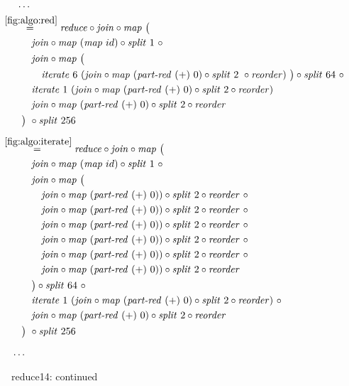 \begin{figure*}[t]
\begin{align*}
  &\hspace{.5em}\ldots\\
%
  &\hspace{-2em}\quad\begin{aligned}
    &\overset{\ref{fig:algo:red}}{=\hspace{.2em}}
      \reduce \circ \join \circ \map\ \big(\\
    &\qquad\quad\join \circ \map\ (\map\ id) \circ \splitN\ 1\ \circ\\
    &\qquad\quad\join \circ \map\ \big(\\
    &\qquad\qquad \iterateN\ 6\ (\join \circ \map\ (\partRed\ (+)\ 0)\circ \splitN\ 2\ \circ \reorder)\ \big)\circ \splitN\ 64\ \circ\\
    &\qquad\quad\iterateN\ 1\ (\join \circ \map\ (\partRed\ (+)\ 0) \circ \splitN\ 2\circ \reorder)\\
    &\qquad\quad\join \circ \map\ (\partRed\ (+)\ 0) \circ \splitN\ 2\circ \reorder\\
    &\qquad\big)\ \circ \splitN\ 256
  \end{aligned}\\[.5em]
%
  &\hspace{-2em}\quad\begin{aligned}
    &\overset{\ref{fig:algo:iterate}}{=\hspace{.2em}}
      \reduce \circ \join \circ \map\ \big(\\
    &\qquad\quad\join \circ \map\ (\map\ id) \circ \splitN\ 1\ \circ\\
    &\qquad\quad\join \circ \map\ \big(\\
    &\qquad\qquad \join \circ \map\ (\partRed\ (+)\ 0))\circ \splitN\ 2 \circ \reorder\ \circ\\
    &\qquad\qquad \join \circ \map\ (\partRed\ (+)\ 0))\circ \splitN\ 2 \circ \reorder\ \circ\\
    &\qquad\qquad \join \circ \map\ (\partRed\ (+)\ 0))\circ \splitN\ 2 \circ \reorder\ \circ\\
    &\qquad\qquad \join \circ \map\ (\partRed\ (+)\ 0))\circ \splitN\ 2 \circ \reorder\ \circ\\
    &\qquad\qquad \join \circ \map\ (\partRed\ (+)\ 0))\circ \splitN\ 2 \circ \reorder\ \circ\\
    &\qquad\qquad \join \circ \map\ (\partRed\ (+)\ 0))\circ \splitN\ 2 \circ \reorder\\
    &\qquad\quad\big)\circ \splitN\ 64\ \circ\\
    &\qquad\quad\iterateN\ 1\ (\join \circ \map\ (\partRed\ (+)\ 0) \circ \splitN\ 2\circ \reorder)\ \circ\\
    &\qquad\quad\join \circ \map\ (\partRed\ (+)\ 0) \circ \splitN\ 2\circ \reorder\\
    &\qquad\big)\ \circ \splitN\ 256
  \end{aligned}\\[.5em]
%
  &\ldots
\end{align*}
\caption{reduce14: continued}
\end{figure*}

